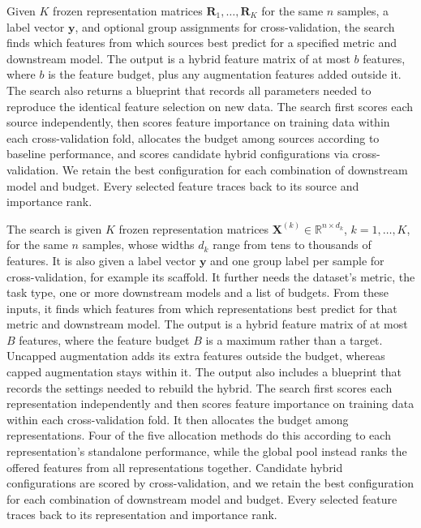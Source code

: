 Given $K$ frozen representation matrices $\mathbf{R}_1, \dots, \mathbf{R}_K$ for the same $n$ samples, a label vector $\mathbf{y}$, and optional group assignments for cross-validation, the search finds which features from which sources best predict for a specified metric and downstream model. The output is a hybrid feature matrix of at most $b$ features, where $b$ is the feature budget, plus any augmentation features added outside it. The search also returns a blueprint that records all parameters needed to reproduce the identical feature selection on new data. The search first scores each source independently, then scores feature importance on training data within each cross-validation fold, allocates the budget among sources according to baseline performance, and scores candidate hybrid configurations via cross-validation. We retain the best configuration for each combination of downstream model and budget. Every selected feature traces back to its source and importance rank.

The search is given $K$ frozen representation matrices $\mathbf{X}^{(k)} \in \mathbb{R}^{n\times d_k}$, $k = 1, \dots, K$, for the same $n$ samples, whose widths $d_k$ range from tens to thousands of features. It is also given a label vector $\mathbf{y}$ and one group label per sample for cross-validation, for example its scaffold. It further needs the dataset's metric, the task type, one or more downstream models and a list of budgets. From these inputs, it finds which features from which representations best predict for that metric and downstream model. The output is a hybrid feature matrix of at most $B$ features, where the feature budget $B$ is a maximum rather than a target. Uncapped augmentation adds its extra features outside the budget, whereas capped augmentation stays within it. The output also includes a blueprint that records the settings needed to rebuild the hybrid. The search first scores each representation independently and then scores feature importance on training data within each cross-validation fold. It then allocates the budget among representations. Four of the five allocation methods do this according to each representation's standalone performance, while the global pool instead ranks the offered features from all representations together. Candidate hybrid configurations are scored by cross-validation, and we retain the best configuration for each combination of downstream model and budget. Every selected feature traces back to its representation and importance rank.

